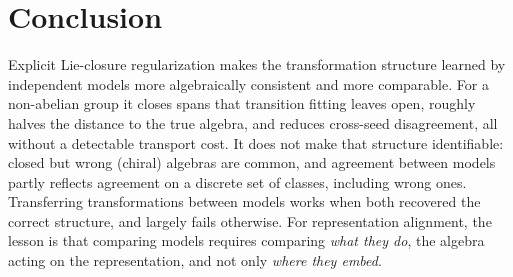 \section{Conclusion}\label{sec:conclusion}
Explicit Lie-closure regularization makes the transformation structure learned by independent models more
algebraically consistent and more comparable. For a non-abelian group it closes spans that transition fitting
leaves open, roughly halves the distance to the true algebra, and reduces cross-seed disagreement, all without a
detectable transport cost. It does not make that structure identifiable: closed but wrong (chiral) algebras are
common, and agreement between models partly reflects agreement on a discrete set of classes, including wrong ones.
Transferring transformations between models works when both recovered the correct structure, and largely
fails otherwise. For representation alignment, the
lesson is that comparing models requires comparing \emph{what they do}, the algebra acting on the
representation, and not only \emph{where they embed}.
